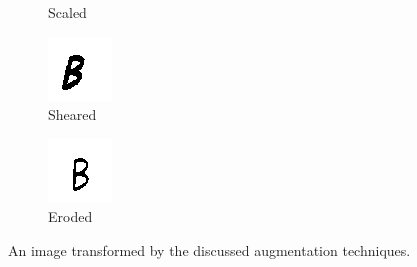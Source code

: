 \documentclass{article}
\begin{document}
\begin{figure}
\begin{subfigure}{0.15\textwidth}
  \caption{Scaled}
\end{subfigure}
\begin{subfigure}{0.15\textwidth}
  \centering
  \includegraphics[width=\linewidth]{images/sheared}
  \caption{Sheared}
\end{subfigure}
\begin{subfigure}{0.15\textwidth}
  \centering
  \includegraphics[width=\linewidth]{images/eroded}
  \caption{Eroded}
\end{subfigure}
\caption{An image transformed by the discussed augmentation techniques.}
\label{fig:augmented}
\end{figure}
\end{document}
